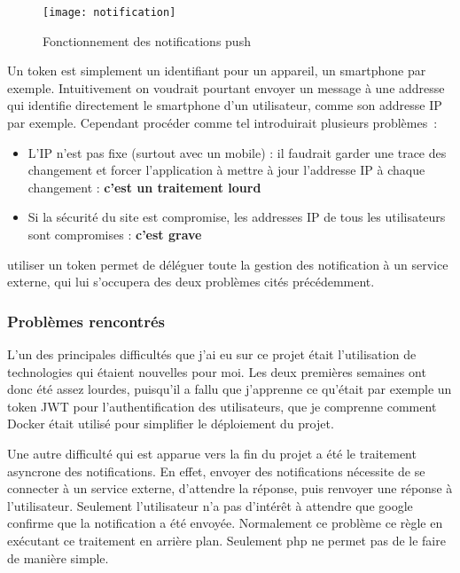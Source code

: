 \documentclass[../rapport.tex]{subfiles}
\begin{document}
        \begin{figure}
            \centering
            \texttt{[image: notification]}
            \caption{Fonctionnement des notifications push}
            \label{fig:notification}
        \end{figure}

        Un token est simplement un identifiant pour un appareil, un smartphone
        par exemple. Intuitivement on voudrait pourtant envoyer un message à
        une addresse qui identifie directement le smartphone d'un utilisateur,
        comme son addresse IP par exemple. Cependant procéder comme tel
        introduirait plusieurs problèmes~:
    \begin{itemize}
        \item L'IP n'est pas fixe (surtout avec un mobile) : il faudrait garder
            une trace des changement et forcer l'application à mettre à jour l'addresse IP à chaque
            changement : \textbf{c'est un traitement lourd}
        \item Si la sécurité du site est compromise, les addresses IP de tous
            les utilisateurs sont compromises : \textbf{c'est grave}
    \end{itemize}
        utiliser un token permet de déléguer toute la gestion des notification à un service externe, qui lui s'occupera des deux problèmes
        cités précédemment.


        \subsubsection{Problèmes rencontrés}
        L'un des principales difficultés que j'ai eu sur ce projet était l'utilisation de technologies qui étaient nouvelles pour moi.
        Les deux premières semaines ont donc été assez lourdes, puisqu'il a fallu que j'apprenne ce qu'était par exemple un token JWT pour l'authentification des utilisateurs, que je comprenne comment Docker était utilisé pour simplifier le déploiement du projet.

        Une autre difficulté qui est apparue vers la fin du projet a été le traitement asyncrone des notifications. En effet, envoyer des notifications nécessite de se connecter à un service externe, d'attendre la réponse, puis renvoyer une réponse à l'utilisateur. Seulement l'utilisateur n'a pas d'intérêt à attendre que google confirme que la notification a été envoyée. Normalement ce problème ce règle en exécutant ce traitement en arrière plan. Seulement php ne permet pas de le faire de manière simple.
\end{document}
